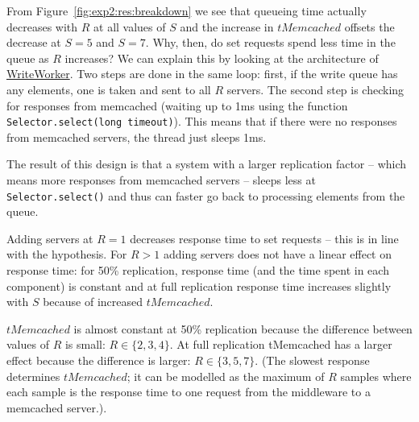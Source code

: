 \documentclass[11pt]{article}
\newcommand{\linkmain}[1]{\href{https://gitlab.inf.ethz.ch/pungast/asl-fall16-project/blob/master/src/main/java/asl/#1.java}{#1}}
\begin{document}
From Figure~\ref{fig:exp2:res:breakdown} we see that queueing time actually decreases with $R$ at all values of $S$ and the increase in $tMemcached$ offsets the decrease at $S=5$ and $S=7$. Why, then, do set requests spend less time in the queue as $R$ increases? We can explain this by looking at the architecture of \linkmain{WriteWorker}. Two steps are done in the same loop: first, if the write queue has any elements, one is taken and sent to all $R$ servers. The second step is checking for responses from memcached (waiting up to 1ms using the function \verb+Selector.select(long timeout)+). This means that if there were no responses from memcached servers, the thread just sleeps 1ms.

The result of this design is that a system with a larger replication factor -- which means more responses from memcached servers -- sleeps less at \verb+Selector.select()+ and thus can faster go back to processing elements from the queue.

Adding servers at $R=1$ decreases response time to set requests -- this is in line with the hypothesis. For $R>1$ adding servers does not have a linear effect on response time: for 50\% replication, response time (and the time spent in each component) is constant and at full replication response time increases slightly with $S$ because of increased $tMemcached$.

$tMemcached$ is almost constant at 50\% replication because the difference between values of $R$ is small: $R \in \{2,3,4\}$. At full replication tMemcached has a larger effect because the difference is larger: $R \in \{3,5,7\}$. (The slowest response determines $tMemcached$; it can be modelled as the maximum of $R$ samples where each sample is the response time to one request from the middleware to a memcached server.).
\end{document}
